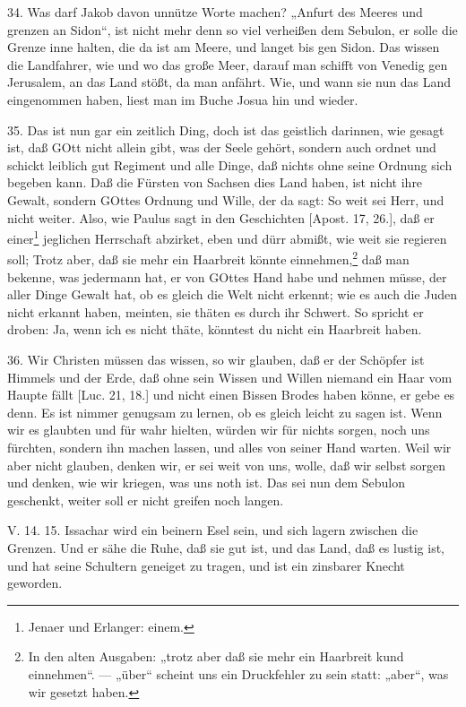 34. Was darf Jakob davon unnütze Worte machen? „Anfurt des Meeres und grenzen an Sidon“, ist nicht mehr denn so viel verheißen dem Sebulon, er solle die Grenze inne halten, die da ist am Meere, und langet bis gen Sidon. Das wissen die Landfahrer, wie und wo das große Meer, darauf man schifft von Venedig gen Jerusalem, an das Land stößt, da man anfährt. Wie, und wann sie nun das Land eingenommen haben, liest man im Buche Josua hin und wieder.

35. Das ist nun gar ein zeitlich Ding, doch ist das geistlich darinnen, wie gesagt ist, daß GOtt nicht allein gibt, was der Seele gehört, sondern auch ordnet und schickt leiblich gut Regiment und alle Dinge, daß nichts ohne seine Ordnung sich begeben kann. Daß die Fürsten von Sachsen dies Land haben, ist nicht ihre Gewalt, sondern GOttes Ordnung und Wille, der da sagt: So weit sei Herr, und nicht weiter. Also, wie Paulus sagt in den Geschichten [Apost. 17, 26.], daß er einer\footnote{Jenaer und Erlanger: einem.} jeglichen Herrschaft abzirket, eben und dürr abmißt, wie weit sie regieren soll; Trotz aber, daß sie mehr ein Haarbreit könnte einnehmen,\footnote{In den alten Ausgaben: „trotz aber daß sie mehr ein Haarbreit kund einnehmen“. — „über“ scheint uns ein Druckfehler zu sein statt: „aber“, was wir gesetzt haben.} daß man bekenne, was jedermann hat, er von GOttes Hand habe und nehmen müsse, der aller Dinge Gewalt hat, ob es gleich die Welt nicht erkennt; wie es auch die Juden nicht erkannt haben, meinten, sie thäten es durch ihr Schwert. So spricht er droben: Ja, wenn ich es nicht thäte, könntest du nicht ein Haarbreit haben.

36. Wir Christen müssen das wissen, so wir glauben, daß er der Schöpfer ist Himmels und der Erde, daß ohne sein Wissen und Willen niemand ein Haar vom Haupte fällt [Luc. 21, 18.] und nicht einen Bissen Brodes haben könne, er gebe es denn. Es ist nimmer genugsam zu lernen, ob es gleich leicht zu sagen ist. Wenn wir es glaubten und für wahr hielten, würden wir für nichts sorgen, noch uns fürchten, sondern
ihn machen lassen, und alles von seiner Hand warten. Weil wir aber nicht glauben, denken wir, er sei weit von uns, wolle, daß wir selbst sorgen und denken, wie wir kriegen, was uns noth ist. Das sei nun dem Sebulon geschenkt, weiter soll er nicht greifen noch langen.

\begin{schriftzitat}
V. 14. 15. Issachar wird ein beinern Esel sein, und sich lagern zwischen die Grenzen. Und er sähe die Ruhe, daß sie gut ist, und das Land, daß es lustig ist, und hat seine Schultern geneiget zu tragen, und ist ein zinsbarer Knecht geworden.
\end{schriftzitat}

